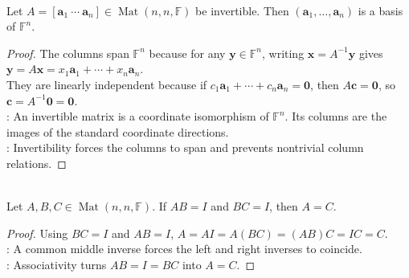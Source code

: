 \begin{theorem} \label{thm:invertible-matrix-columns-basis} \\
Let $A=[\mathbf{a}_1\ \cdots\ \mathbf{a}_n]\in\operatorname{Mat}(n,n,\mathbb{F})$ be invertible. Then $(\mathbf{a}_1,\ldots,\mathbf{a}_n)$ is a basis of $\mathbb{F}^n$.
\begin{proof}
The columns span $\mathbb{F}^n$ because for any $\mathbf{y}\in\mathbb{F}^n$, writing $\mathbf{x}=A^{-1}\mathbf{y}$ gives $\mathbf{y}=A\mathbf{x}=x_1\mathbf{a}_1+\cdots+x_n\mathbf{a}_n$.\\
They are linearly independent because if $c_1\mathbf{a}_1+\cdots+c_n\mathbf{a}_n=\mathbf{0}$, then $A\mathbf{c}=\mathbf{0}$, so $\mathbf{c}=A^{-1}\mathbf{0}=\mathbf{0}$.\\
: An invertible matrix is a coordinate isomorphism of $\mathbb{F}^n$. Its columns are the images of the standard coordinate directions.\\
: Invertibility forces the columns to span and prevents nontrivial column relations.
\end{proof}
\end{theorem}

\begin{lemma} \label{lem:two-sided-inverse-uniqueness} \\
Let $A,B,C\in\operatorname{Mat}(n,n,\mathbb{F})$. If $AB=I$ and $BC=I$, then $A=C$.
\begin{proof}
Using $BC=I$ and $AB=I$, $A=AI=A(BC)=(AB)C=IC=C$.\\
: A common middle inverse forces the left and right inverses to coincide.\\
: Associativity turns $AB=I=BC$ into $A=C$.
\end{proof}
\end{lemma}

